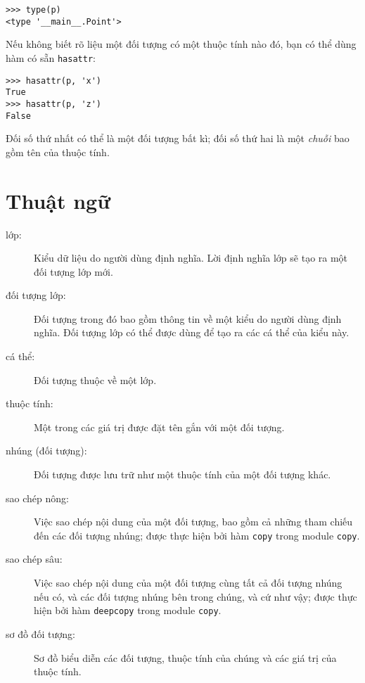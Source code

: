 \documentclass[11pt]{book}
\begin{document}

\beforeverb
\begin{verbatim}
>>> type(p)
<type '__main__.Point'>
\end{verbatim}
\afterverb
%
Nếu không biết rõ liệu một đối tượng có một thuộc tính nào đó,
bạn có thể dùng hàm có sẵn {\tt hasattr}:


\beforeverb
\begin{verbatim}
>>> hasattr(p, 'x')
True
>>> hasattr(p, 'z')
False
\end{verbatim}
\afterverb
%
Đối số thứ nhất có thể là một đối tượng bất kì; đối số thứ hai là một {\em
chuỗi} bao gồm tên của thuộc tính.


\section{Thuật ngữ}

\begin{description}

\item[lớp:] Kiểu dữ liệu do người dùng định nghĩa. Lời định nghĩa lớp sẽ tạo ra
một đối tượng lớp mới.

\item[đối tượng lớp:] Đối tượng trong đó bao gồm thông tin về một kiểu
do người dùng định nghĩa. Đối tượng lớp có thể được dùng để tạo ra các
cá thể của kiểu này.

\item[cá thể:] Đối tượng thuộc về một lớp.

\item[thuộc tính:] Một trong các giá trị được đặt tên gắn với một đối tượng.

\item[nhúng (đối tượng):] Đối tượng được lưu trữ như một thuộc tính của một 
đối tượng khác.

\item[sao chép nông:] Việc sao chép nội dung của một đối tượng, bao gồm cả
những tham chiếu đến các đối tượng nhúng;
được thực hiện bởi hàm {\tt copy} trong module {\tt copy}.

\item[sao chép sâu:] Việc sao chép nội dung của một đối tượng cùng tất cả
đối tượng nhúng nếu có, và các đối tượng nhúng bên trong chúng, và cứ 
như vậy; được thực hiện bởi hàm {\tt deepcopy} trong module {\tt copy}.

\item[sơ đồ đối tượng:] Sơ đồ biểu diễn các đối tượng, thuộc tính của chúng
và các giá trị của thuộc tính.

\end{description}
\end{document}
